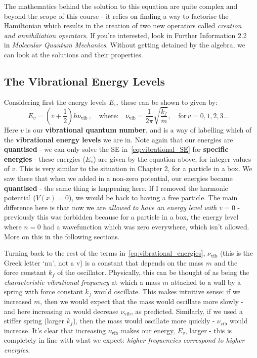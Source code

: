 \documentclass{memoir}[11pt,oneside,a4paper,openany]
\newcommand{\nuv}{\ensuremath{\nu_{\text{vib}}}}
\begin{document}
The mathematics behind the solution to this equation are quite complex and beyond the scope of this course - it relies on finding a way to factorise the Hamiltonian which results in the creation of two new operators called \emph{creation and annihiliation operators}. If you're interested, look in Further Information 2.2 in \emph{Molecular Quantum Mechanics}. Without getting detained by the algebra, we can look at the solutions and their properties. 

\subsection{The Vibrational Energy Levels}
Considering first the energy levels $E_v$, these can be shown to given by:
\begin{equation}\label{eq:vibrational_energies}
	E_v = (v+\frac{1}{2})h\nuv\,,\quad \text{where:}\quad \nuv = \frac{1}{2\pi}\sqrt{\frac{k_f}{m}},\quad\text{for}\, v=0,1,2,3...
\end{equation}
Here $v$ is our \textbf{vibrational quantum number}, and is a way of labelling which of the \textbf{vibrational energy levels} we are in. Note again that our energies are \textbf{quantised} - we can only solve the SE in~\autoref{eq:vibrational_SE} for \textbf{specific energies} - these energies ($E_v$) are given by the equation above, for integer values of $v$. This is very similar to the situation in Chapter 2, for a particle in a box. We saw there that when we added in a non-zero potential, our energies became \textbf{quantised} - the same thing is happening here. If I removed the harmonic potential ($V(x)=0$), we would be back to having a free particle. The main difference here is that now we are \emph{allowed to have an energy level with $v=0$} - previously this was forbidden because for a particle in a box, the energy level where $n=0$ had a wavefunction which was zero everywhere, which isn't allowed. More on this in the following sections. 

Turning back to the rest of the terms in~\autoref{eq:vibrational_energies}, $\nuv$ (this is the Greek letter `nu', not a v) is a constant that depends on the mass $m$ and the force constant $k_f$ of the oscillator. Physically, this can be thought of as being the \emph{characteristic vibrational frequency} at which a mass $m$ attached to a wall by a spring with force constant $k_f$ would oscillate. This makes intuitive sense: if we increased $m$, then we would expect that the mass would oscillate more slowly - and here increasing $m$ would decrease $\nuv$, as predicted. Similarly, if we used a stiffer spring (larger $k_f$), then the mass would oscillate more quickly - $\nuv$ would increase. It's clear that increasing $\nuv$ makes our energy, $E_v$, larger - this is completely in line with what we expect: \emph{higher frequencies correspond to higher energies}.  
\end{document}
